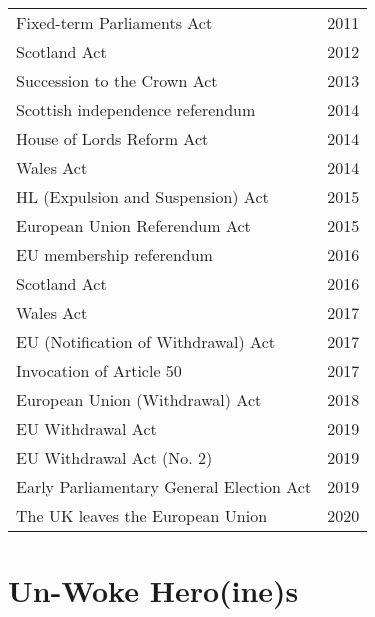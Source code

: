 \documentclass[14pt,titlepage]{extarticle}
\begin{document}
{\begin{longtable}{l l}
Fixed-term Parliaments Act & 2011\\
Scotland Act &  2012\\
Succession to the Crown Act &  2013\\
Scottish independence referendum & 2014\\
House of Lords Reform Act & 2014\\
Wales Act &  2014\\
HL (Expulsion and Suspension) Act & 2015\\
European Union Referendum Act & 2015\\
EU membership referendum & 2016\\
Scotland Act &  2016\\
Wales Act &  2017\\
EU (Notification of Withdrawal) Act & 2017\\
Invocation of Article 50 & 2017\\
European Union (Withdrawal) Act & 2018\\
EU Withdrawal Act &  2019\\
EU Withdrawal Act (No. 2) & 2019\\
Early Parliamentary General Election Act & 2019\\
The UK leaves the European Union & 2020\\
\end{longtable}
}%

\section{Un-Woke Hero(ine)s}\label{heroines}
\end{document}
